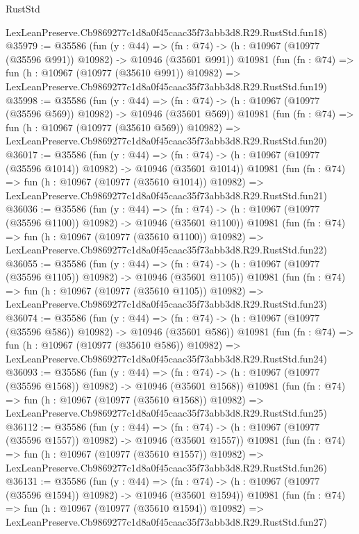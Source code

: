 \begin{lexlean}{RustStd}
\begin{coremodule}
    LexLeanPreserve.Cb9869277c1d8a0f45caac35f73abb3d8.R29.RustStd.fun18)
@35979 := @35586
    (fun (y : @44) =>
    (fn : @74) -> (h : @10967 (@10977 (@35596 @991)) @10982) -> @10946 (@35601 @991))
    @10981
    (fun (fn : @74) =>
    fun (h : @10967 (@10977 (@35610 @991)) @10982) =>
    LexLeanPreserve.Cb9869277c1d8a0f45caac35f73abb3d8.R29.RustStd.fun19)
@35998 := @35586
    (fun (y : @44) =>
    (fn : @74) -> (h : @10967 (@10977 (@35596 @569)) @10982) -> @10946 (@35601 @569))
    @10981
    (fun (fn : @74) =>
    fun (h : @10967 (@10977 (@35610 @569)) @10982) =>
    LexLeanPreserve.Cb9869277c1d8a0f45caac35f73abb3d8.R29.RustStd.fun20)
@36017 := @35586
    (fun (y : @44) =>
    (fn : @74) -> (h : @10967 (@10977 (@35596 @1014)) @10982) -> @10946 (@35601 @1014))
    @10981
    (fun (fn : @74) =>
    fun (h : @10967 (@10977 (@35610 @1014)) @10982) =>
    LexLeanPreserve.Cb9869277c1d8a0f45caac35f73abb3d8.R29.RustStd.fun21)
@36036 := @35586
    (fun (y : @44) =>
    (fn : @74) -> (h : @10967 (@10977 (@35596 @1100)) @10982) -> @10946 (@35601 @1100))
    @10981
    (fun (fn : @74) =>
    fun (h : @10967 (@10977 (@35610 @1100)) @10982) =>
    LexLeanPreserve.Cb9869277c1d8a0f45caac35f73abb3d8.R29.RustStd.fun22)
@36055 := @35586
    (fun (y : @44) =>
    (fn : @74) -> (h : @10967 (@10977 (@35596 @1105)) @10982) -> @10946 (@35601 @1105))
    @10981
    (fun (fn : @74) =>
    fun (h : @10967 (@10977 (@35610 @1105)) @10982) =>
    LexLeanPreserve.Cb9869277c1d8a0f45caac35f73abb3d8.R29.RustStd.fun23)
@36074 := @35586
    (fun (y : @44) =>
    (fn : @74) -> (h : @10967 (@10977 (@35596 @586)) @10982) -> @10946 (@35601 @586))
    @10981
    (fun (fn : @74) =>
    fun (h : @10967 (@10977 (@35610 @586)) @10982) =>
    LexLeanPreserve.Cb9869277c1d8a0f45caac35f73abb3d8.R29.RustStd.fun24)
@36093 := @35586
    (fun (y : @44) =>
    (fn : @74) -> (h : @10967 (@10977 (@35596 @1568)) @10982) -> @10946 (@35601 @1568))
    @10981
    (fun (fn : @74) =>
    fun (h : @10967 (@10977 (@35610 @1568)) @10982) =>
    LexLeanPreserve.Cb9869277c1d8a0f45caac35f73abb3d8.R29.RustStd.fun25)
@36112 := @35586
    (fun (y : @44) =>
    (fn : @74) -> (h : @10967 (@10977 (@35596 @1557)) @10982) -> @10946 (@35601 @1557))
    @10981
    (fun (fn : @74) =>
    fun (h : @10967 (@10977 (@35610 @1557)) @10982) =>
    LexLeanPreserve.Cb9869277c1d8a0f45caac35f73abb3d8.R29.RustStd.fun26)
@36131 := @35586
    (fun (y : @44) =>
    (fn : @74) -> (h : @10967 (@10977 (@35596 @1594)) @10982) -> @10946 (@35601 @1594))
    @10981
    (fun (fn : @74) =>
    fun (h : @10967 (@10977 (@35610 @1594)) @10982) =>
    LexLeanPreserve.Cb9869277c1d8a0f45caac35f73abb3d8.R29.RustStd.fun27)

\end{coremodule}
\end{lexlean}
